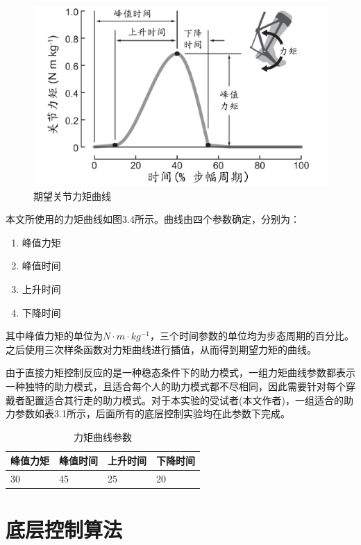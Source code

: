 \begin{figure}[htb]
    \includegraphics[width=15cm]{fig/f51.jpg}
    \caption{期望关节力矩曲线}
    \label{fig:mark}
\end{figure}

本文所使用的力矩曲线如图3.4所示。曲线由四个参数确定，分别为：
\begin{enumerate}
    \item 峰值力矩
    \item 峰值时间
    \item 上升时间
    \item 下降时间
\end{enumerate}
其中峰值力矩的单位为$N\cdot m \cdot kg^{-1}$，三个时间参数的单位均为步态周期的百分比。之后使用三次样条函数对力矩曲线进行插值，从而得到期望力矩的曲线。

由于直接力矩控制反应的是一种稳态条件下的助力模式，一组力矩曲线参数都表示一种独特的助力模式，且适合每个人的助力模式都不尽相同，因此需要针对每个穿戴者配置适合其行走的助力模式。对于本实验的受试者(本文作者)，一组适合的助力参数如表3.1所示，后面所有的底层控制实验均在此参数下完成。

\begin{table}[htb]
    \caption[力矩曲线]{力矩曲线参数}
    \begin{tabular}{llll}
      \toprule
        峰值力矩 & 峰值时间 & 上升时间 & 下降时间 \\
      \midrule
        30 & 45 & 25 & 20 \\
      \bottomrule
    \end{tabular}
\end{table}

\section{底层控制算法}
                                                                                        
